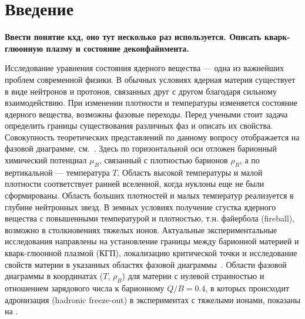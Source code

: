 \chapter*{Введение}\label{sec:secIntro}

\todo
\textbf{Ввести понятие кхд, оно тут несколько раз используется. Описать кварк-глюонную плазму и состояние деконфайнмента.}


Исследование уравнения состояния ядерного вещества --- одна из важнейших проблем современной физики. В обычных условиях ядерная материя существует в виде нейтронов и протонов, связанных друг с другом благодаря сильному взаимодействию. При изменении плотности и температуры изменяется состояние ядерного вещества, возможны фазовые переходы. Перед учеными стоит задача определить границы существования различных фаз и описать их свойства. Совокупность теоретических представлений по данному вопросу отображается на фазовой диаграмме, см.~. Здесь по горизонтальной оси отложен барионный химический потенциал $\mu_{B}$, связанный с плотностью барионов $\rho_{B}$, а по вертикальной --- температура $T$. Область высокой температуры и малой плотности соответствует ранней вселенной, когда нуклоны еще не были сформированы. Область больших плотностей и малых температур реализуется в глубине нейтронных звезд. В земных условиях получение сгустка ядерного вещества с повышенными температурой и плотностью, т.н. файербола (fireball), возможно в столкновениях тяжелых ионов. Актуальные экспериментальные исследования направлены на установление границы между барионной материей и кварк-глюонной плазмой (КГП), локализацию критической точки и исследование свойств материи в указанных областях фазовой диаграммы~\cite{CBMBook}. Области фазовой диаграммы в координатах ($T$, $\rho_{B}$) для материи с нулевой странностью и отношением зарядового числа к барионному $Q/B=0.4$, в которых происходит адронизация (hadronic freeze-out) в экспериментах с тяжелыми ионами, показаны на .

